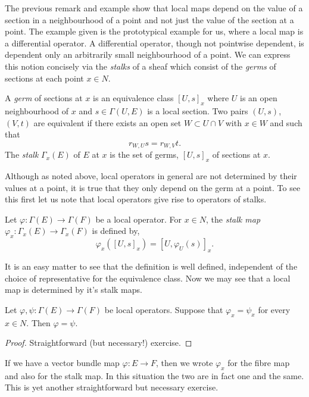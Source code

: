 \documentclass{amsart}
\begin{document}
The previous remark and example show that local maps depend on the value of a section in a neighbourhood of a point and not just the value of the section at a point. The example given is the prototypical example for us, where a local map is a differential operator. A differential operator, though not pointwise dependent, is dependent only an arbitrarily small neighbourhood of a point. We can express this notion concisely via the \emph{stalks} of a sheaf which consist of the \emph{germs} of sections at each point \(x \in N\).

\begin{defn}
A \emph{germ} of sections at \(x\) is an equivalence class \([U, s]_x\) where \(U\) is an open neighbourhood of \(x\) and \(s \in \Gamma(U, E)\) is a local section. Two pairs \((U, s)\), \((V, t)\) are equivalent if there exists an open set \(W \subset U \cap V\) with \(x \in W\) and such that
\[
r_{W, U} s = r_{W, V} t.
\]
The \emph{stalk} \(\Gamma_x(E)\) of \(E\) at \(x\) is the set of germs, \([U, s]_x\) of sections at \(x\).
\end{defn}

Although as noted above, local operators in general are not determined by their values at a point, it is true that they only depend on the germ at a point. To see this first let us note that local operators give rise to operators of stalks.

\begin{defn}
Let \(\varphi : \Gamma(E) \to \Gamma(F)\) be a local operator. For \(x \in N\), the \emph{stalk map} \(\varphi_x : \Gamma_x(E) \to \Gamma_x (F)\) is defined by,
\[
\varphi_x ([U, s]_x) = [U, \varphi_U(s)]_x.
\]
\end{defn}

It is an easy matter to see that the definition is well defined, independent of the choice of representative for the equivalence class. Now we may see that a local map is determined by it's stalk maps.

\begin{lemma}
Let \(\varphi, \psi : \Gamma(E) \to \Gamma(F)\) be local operators. Suppose that \(\varphi_x = \psi_x\) for every \(x \in N\). Then \(\varphi = \psi\).
\end{lemma}

\begin{proof}
Straightforward (but necessary!) exercise.
\end{proof}

\begin{rem}
If we have a vector bundle map \(\varphi : E \to F\), then we wrote \(\varphi_x\) for the fibre map and also for the stalk map. In this situation the two are in fact one and the same. This is yet another straightforward but necessary exercise.
\end{rem}
\end{document}
